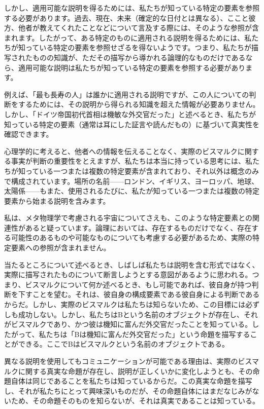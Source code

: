 \documentclass[a4paper,11pt,openany]{ltjsbook}
\begin{document}
しかし、適用可能な説明を得るためには、私たちが知っている特定の要素を参照する必要があります。過去、現在、未来（確定的な日付とは異なる）、ここと彼方、他者が教えてくれたことなどについて言及する際には、そのような参照が含まれます。したがって、ある特定のものに適用される説明を得るためには、私たちが知っている特定の要素を参照せざるを得ないようです。つまり、私たちが描写されたものの知識が、ただその描写から導かれる論理的なものだけであるなら、適用可能な説明は私たちが知っている特定の要素を参照する必要があります。

例えば、「最も長寿の人」は誰かに適用される説明ですが、この人についての判断をするためには、その説明から得られる知識を超えた情報が必要ありません。しかし、「ドイツ帝国初代首相は機敏な外交官だった」と述べるとき、私たちが知っている特定の要素（通常は耳にした証言や読んだもの）に基づいて真実性を確認できます。

心理学的に考えると、他者への情報を伝えることなく、実際のビスマルクに関する事実が判断の重要性をとえますが、私たちは本当に持っている思考には、私たちが知っている一つまたは複数の特定要素が含まれており、それ以外は概念のみで構成されています。場所の名前——ロンドン、イギリス、ヨーロッパ、地球、太陽係——もまた、使用されるたびに、私たが知っている一つまたは複数の特定要素から始まる説明を含みます。

私は、メタ物理学で考慮される宇宙についてさえも、このような特定要素との関連性があると疑っています。論理においては、存在するものだけでなく、存在する可能性のあるものや可能なものについても考慮する必要があるため、実際の特定要素への参照が含まれません。

当たるところについて述べるとき、しばしば私たちは説明を含む形式ではなく、実際に描写されたものについて断言しようとする意図があるように思われる。つまり、ビスマルクについて何か述べるとき、もし可能であれば、彼自身が持つ判断を下すことを望む。それは、彼自身の構成要素である彼自身による判断であるからだ。しかし、実際のビスマルクは私たちは知らないため、この目標には必ずしも成功しない。しかし、私たちはBという名前のオブジェクトが存在し、それがビスマルクであり、かつ彼は機知に富んだ外交官だったことを知っている。したがって、私たちは「Bは機知に富んだ外交官だった」という命題を描写することができる。ここでBはビスマルクという名前のオブジェクトである。

異なる説明を使用してもコミュニケーションが可能である理由は、実際のビスマルクに関する真実な命題が存在し、説明が正しくいかに変化しようとも、その命題自体は同じであることを私たちは知っているからだ。この真実な命題を描写し、それが私たちにとって興味深いものだが、その命題自体にはまだなじみがないため、その命題そのものを知らないが、それは真実であることは知っている。
\end{document}
